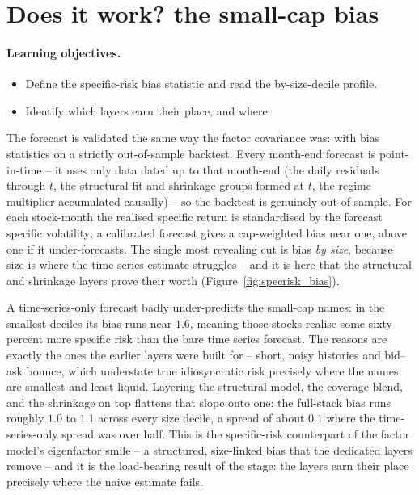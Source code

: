 \documentclass[11pt]{article}
\theoremstyle{definition}
\theoremstyle{plain}
\theoremstyle{remark}
\begin{document}
\section{Does it work? the small-cap bias}\label{sec:valid}

\paragraph{Learning objectives.}
\begin{itemize}[leftmargin=1.4em,topsep=2pt]
  \item Define the specific-risk bias statistic and read the by-size-decile profile.
  \item Identify which layers earn their place, and where.
\end{itemize}

The forecast is validated the same way the factor covariance was: with bias statistics on a strictly out-of-sample backtest. Every month-end forecast is point-in-time -- it uses only data dated up to that month-end (the daily residuals through $t$, the structural fit and shrinkage groups formed at $t$, the regime multiplier accumulated causally) -- so the backtest is genuinely out-of-sample. For each stock-month the realised specific return is standardised by the forecast specific volatility; a calibrated forecast gives a cap-weighted bias near one, above one if it under-forecasts. The single most revealing cut is bias \emph{by size}, because size is where the time-series estimate struggles -- and it is here that the structural and shrinkage layers prove their worth (Figure~\ref{fig:specrisk_bias}).

A time-series-only forecast badly under-predicts the small-cap names: in the smallest deciles its bias runs near $1.6$, meaning those stocks realise some sixty percent more specific risk than the bare time series forecast. The reasons are exactly the ones the earlier layers were built for -- short, noisy histories and bid--ask bounce, which understate true idiosyncratic risk precisely where the names are smallest and least liquid. Layering the structural model, the coverage blend, and the shrinkage on top flattens that slope onto one: the full-stack bias runs roughly $1.0$ to $1.1$ across every size decile, a spread of about $0.1$ where the time-series-only spread was over half. This is the specific-risk counterpart of the factor model's eigenfactor smile -- a structured, size-linked bias that the dedicated layers remove -- and it is the load-bearing result of the stage: the layers earn their place precisely where the naive estimate fails.
\end{document}

